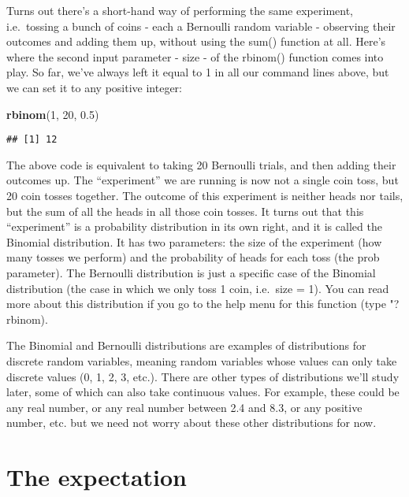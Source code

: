 \documentclass[
]{book}
\newenvironment{Shaded}{\begin{snugshade}}{\end{snugshade}}
\newcommand{\DecValTok}[1]{\textcolor[rgb]{0.00,0.00,0.81}{#1}}
\newcommand{\FloatTok}[1]{\textcolor[rgb]{0.00,0.00,0.81}{#1}}
\newcommand{\KeywordTok}[1]{\textcolor[rgb]{0.13,0.29,0.53}{\textbf{#1}}}
\newcommand{\NormalTok}[1]{#1}
\begin{document}
Turns out there's a short-hand way of performing the same experiment, i.e.~tossing a bunch of coins - each a Bernoulli random variable - observing their outcomes and adding them up, without using the sum() function at all. Here's where the second input parameter - size - of the rbinom() function comes into play. So far, we've always left it equal to 1 in all our command lines above, but we can set it to any positive integer:

\begin{Shaded}
\begin{Highlighting}[]
\KeywordTok{rbinom}\NormalTok{(}\DecValTok{1}\NormalTok{, }\DecValTok{20}\NormalTok{, }\FloatTok{0.5}\NormalTok{)}
\end{Highlighting}
\end{Shaded}

\begin{verbatim}
## [1] 12
\end{verbatim}

The above code is equivalent to taking 20 Bernoulli trials, and then adding their outcomes up. The ``experiment'' we are running is now not a single coin toss, but 20 coin tosses together. The outcome of this experiment is neither heads nor tails, but the sum of all the heads in all those coin tosses. It turns out that this ``experiment'' is a probability distribution in its own right, and it is called the Binomial distribution. It has two parameters: the size of the experiment (how many tosses we perform) and the probability of heads for each toss (the prob parameter). The Bernoulli distribution is just a specific case of the Binomial distribution (the case in which we only toss 1 coin, i.e.~size = 1). You can read more about this distribution if you go to the help menu for this function (type "?rbinom).

The Binomial and Bernoulli distributions are examples of distributions for discrete random variables, meaning random variables whose values can only take discrete values (0, 1, 2, 3, etc.). There are other types of distributions we'll study later, some of which can also take continuous values. For example, these could be any real number, or any real number between 2.4 and 8.3, or any positive number, etc. but we need not worry about these other distributions for now.

\hypertarget{the-expectation}{%
\section{The expectation}\label{the-expectation}}
\end{document}
